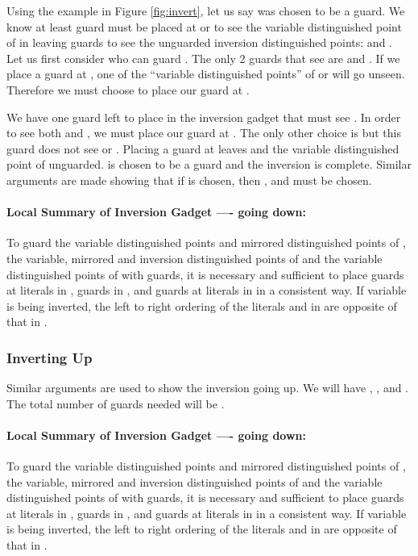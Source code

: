 \documentclass[11pt]{article}
\begin{document}
Using the example in Figure \ref{fig:invert}, let us say  was chosen to be a guard.  We know at least  guard must be placed at  or  to see the variable distinguished point of  in  leaving  guards to see the unguarded inversion distinguished points:  and .  Let us first consider who can guard .  The only 2 guards that see  are  and .  If we place a guard at , one of the ``variable distinguished points'' of  or  will go unseen.  Therefore we must choose to place our guard at .

We have one guard left to place in the inversion gadget that must see .  In order to see both  and , we must place our guard at .  The only other choice is  but this guard does not see  or .  Placing a guard at  leaves  and the variable distinguished point of  unguarded.   is chosen to be a guard and the inversion is complete.  Similar arguments are made showing that if  is chosen, then ,  and  must be chosen.

\paragraph{Local Summary of Inversion Gadget ---- going down:}  To guard the variable distinguished points and mirrored distinguished points of , the variable, mirrored and inversion distinguished points of  and the variable distinguished points of  with  guards, it is necessary and sufficient to place  guards at literals in ,  guards in , and  guards at literals in  in a consistent way.  If variable  is being inverted, the left to right ordering of the literals  and  in  are opposite of that in .

\subsubsection{Inverting Up}

Similar arguments are used to show the inversion going up.  We will have , ,  and .  The total number of guards needed will be .  



\paragraph{Local Summary of Inversion Gadget ---- going down:}  To guard the variable distinguished points and mirrored distinguished points of , the variable, mirrored and inversion distinguished points of  and the variable distinguished points of  with  guards, it is necessary and sufficient to place  guards at literals in ,  guards in , and  guards at literals in  in a consistent way.  If variable  is being inverted, the left to right ordering of the literals  and  in  are opposite of that in .
\end{document}

